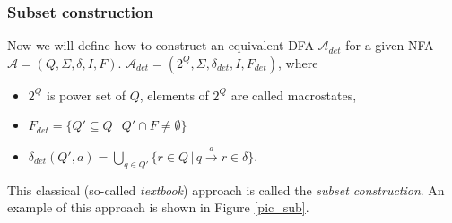   \subsubsection{Subset construction}
	\label{subset}
	Now we will define how to construct an equivalent DFA $\mathcal{A}_{det}$ for a given NFA $\mathcal{A}=(Q,\Sigma,\delta,I,F)$. 
	$\mathcal{A}_{det}=(2^Q,\Sigma,\delta_{det},I,F_{det})$, where
	\begin{itemize}
		\item $2^Q$ is power set of $Q$, elements of $2^Q$ are called macrostates,
		\item $F_{det}=\{Q'\subseteq Q\ |\ Q'\cap F \not = \emptyset\}$
		\item $\delta_{det}(Q',a)=\bigcup\limits_{q\in Q'}\{r\in Q\,|\,q\xrightarrow{a}r \in \delta\}$.
	\end{itemize}

  This classical (so-called \emph{textbook}) approach is called the \emph{subset construction}.
    An example of this approach is shown in Figure \ref{pic_sub}.
	
